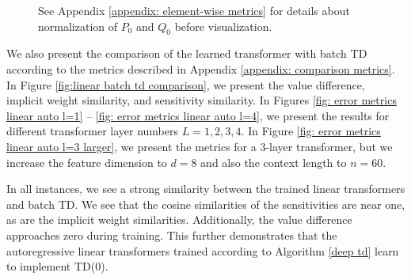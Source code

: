 \documentclass{article}
\begin{document}
\begin{figure}[htbp]
{    See Appendix \ref{appendix: element-wise metrics} for details about normalization of $P_0$ and $Q_0$ before visualization.
    }
    \label{fig: linear parameter convergence auto l=1,2,4}
\end{figure}

We also present the comparison of the learned transformer with batch TD according to the metrics described in Appendix \ref{appendix: comparison metrics}. 
In Figure \ref{fig:linear batch td comparison}, 
we present the value difference,
implicit weight similarity,
and sensitivity similarity.
In Figures \ref{fig: error metrics linear auto l=1} -- \ref{fig: error metrics linear auto l=4}, we present the results for different transformer layer numbers $L=1,2,3,4$. In Figure \ref{fig: error metrics linear auto l=3 larger}, 
we present the metrics for a 3-layer transformer, but we increase the feature dimension to $d=8$ and also the context length to $n=60$. 

In all instances, we see a strong similarity between the trained linear transformers and batch TD. 
We see that the cosine similarities of the sensitivities are near one, 
as are the implicit weight similarities. 
Additionally, the value difference 
approaches zero during training. 
This further demonstrates that the autoregressive linear transformers trained according to Algorithm \ref{deep td} learn to implement TD(0).
\end{document}
